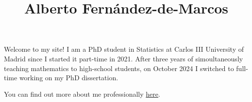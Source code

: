 \title{Alberto Fernández-de-Marcos}


Welcome to my site! I am a PhD student in Statistics at Carlos III University of Madrid since I started it part-time in 2021. After three years of simoultaneously teaching mathematics to high-school students, on October 2024 I switched to full-time working on my PhD dissertation.

You can find out more about me professionally \href{/resume/}{here}.
